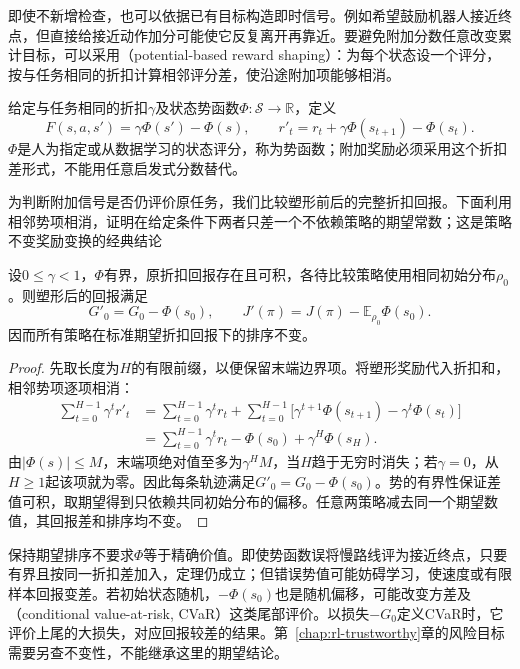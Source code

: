 即使不新增检查，也可以依据已有目标构造即时信号。例如希望鼓励机器人接近终点，但直接给接近动作加分可能使它反复离开再靠近。要避免附加分数任意改变累计目标，可以采用（potential-based reward shaping）：为每个状态设一个评分，按与任务相同的折扣计算相邻评分差，使沿途附加项能够相消。

\begin{definition}[潜势型塑形]
  \label{def:rl-reward-shaping}
  给定与任务相同的折扣$\gamma$及状态势函数$\Phi:\mathcal S\to\mathbb R$，定义
  \[
    F(s,a,s')=\gamma\Phi(s')-\Phi(s),\qquad
    r'_t=r_t+\gamma\Phi(s_{t+1})-\Phi(s_t).
  \]
  $\Phi$是人为指定或从数据学习的状态评分，称为势函数；附加奖励必须采用这个折扣差形式，不能用任意启发式分数替代。
\end{definition}

为判断附加信号是否仍评价原任务，我们比较塑形前后的完整折扣回报。下面利用相邻势项相消，证明在给定条件下两者只差一个不依赖策略的期望常数；这是策略不变奖励变换的经典结论

\begin{theorem}[无限折扣时域的塑形不变性]
  \label{thm:rl-reward-shaping}
  设$0\leq\gamma<1$，$\Phi$有界，原折扣回报存在且可积，各待比较策略使用相同初始分布$\rho_0$。则塑形后的回报满足
  \[
    G'_0=G_0-\Phi(s_0),\qquad
    J'(\pi)=J(\pi)-\mathbb E_{\rho_0}\Phi(s_0).
  \]
  因而所有策略在标准期望折扣回报下的排序不变。
\end{theorem}

\begin{proof}
  先取长度为$H$的有限前缀，以便保留末端边界项。将塑形奖励代入折扣和，相邻势项逐项相消：
  \begin{align*}
    \sum_{t=0}^{H-1}\gamma^t r'_t
    &=\sum_{t=0}^{H-1}\gamma^t r_t
       +\sum_{t=0}^{H-1}
          \bigl[\gamma^{t+1}\Phi(s_{t+1})
                          -\gamma^t\Phi(s_t)\bigr]\\
    &=\sum_{t=0}^{H-1}\gamma^t r_t
       -\Phi(s_0)+\gamma^H\Phi(s_H).
  \end{align*}
  由$|\Phi(s)|\leq M$，末端项绝对值至多为$\gamma^H M$，当$H$趋于无穷时消失；若$\gamma=0$，从$H\geq1$起该项就为零。因此每条轨迹满足$G'_0=G_0-\Phi(s_0)$。势的有界性保证差值可积，取期望得到只依赖共同初始分布的偏移。任意两策略减去同一个期望数值，其回报差和排序均不变。
\end{proof}

保持期望排序不要求$\Phi$等于精确价值。即使势函数误将慢路线评为接近终点，只要有界且按同一折扣差加入，定理仍成立；但错误势值可能妨碍学习，使速度或有限样本回报变差。若初始状态随机，$-\Phi(s_0)$也是随机偏移，可能改变方差及（conditional value-at-risk, CVaR）这类尾部评价。以损失$-G_0$定义CVaR时，它评价上尾的大损失，对应回报较差的结果。第~\ref{chap:rl-trustworthy}章的风险目标需要另查不变性，不能继承这里的期望结论。

